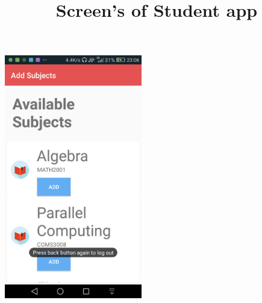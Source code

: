 \documentclass[12pt]{article}
\begin{document}
\begin{flushleft}
\includegraphics[width=60mm]{./Sprint3Models/Screenshots/availablesubjects.png}
\end{flushleft}

\begin{flushleft}
 \title{Screen's of Student app}\\
 \end{flushleft}
 
\end{document}
